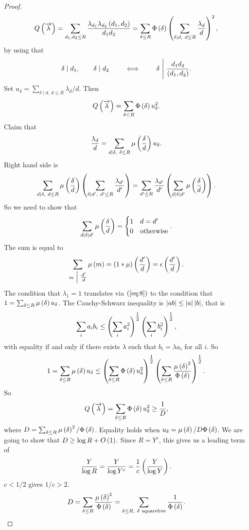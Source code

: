 \begin{proof}
$$ Q\left( \overrightarrow{\lambda} \right) = \sum_{d_1, d_2 \le R} \dfrac{\lambda_{d_1}\lambda_{d_2}\left( d_1, d_2 \right)}{d_1d_2} = \sum_{\delta \le R} \Phi\left( \delta \right)\left( \sum_{\delta \mid d, \ d \le R} \dfrac{\lambda_d}{d} \right)^2, $$
by using that
$$ \delta \mid d_1, \qquad \delta \mid d_2 \qquad \iff \qquad \delta \ \Bigg| \ \dfrac{d_1d_2}{\left( d_1, d_2 \right)}. $$
Set $ u_\delta = \sum_{\delta \mid d, \ d \le R} \lambda_d / d $.
Then
$$ Q\left( \overrightarrow{\lambda} \right) = \sum_{\delta \le R} \Phi\left( \delta \right)u_\delta^2. $$
Claim that
\begin{equation}
\label{eq:8}
\dfrac{\lambda_d}{d} = \sum_{d \mid \delta, \ \delta \le R} \mu\left( \dfrac{\delta}{d} \right)u_\delta.
\end{equation}
Right hand side is
$$ \sum_{d \mid \delta, \ d \le R} \mu\left( \dfrac{\delta}{d} \right)\left( \sum_{\delta \mid d', \ d' \le R} \dfrac{\lambda_{d'}}{d'} \right) = \sum_{d' \le R} \dfrac{\lambda_{d'}}{d'}\left( \sum_{d \mid \delta \mid d'} \mu\left( \dfrac{\delta}{d} \right) \right). $$
So we need to show that
$$ \sum_{d \mid \delta \mid d'} \mu\left( \dfrac{\delta}{d} \right) =
\begin{cases}
1 & d = d' \\
0 & \text{otherwise}
\end{cases}.
$$
The sum is equal to
$$ \sum_{m \ \Big| \  \tfrac{d'}{d}} \mu\left( m \right) = \left( 1 * \mu \right)\left( \dfrac{d'}{d} \right) = \epsilon\left( \dfrac{d'}{d} \right). $$
The condition that $ \lambda_1 = 1 $ translates via $ \left( \ref{eq:8} \right) $ to the condition that $ 1 = \sum_{\delta \le R} \mu\left( \delta \right)u_\delta $. The Cauchy-Schwarz inequality is $ \left\lvert ab \right\rvert \le \left\lvert a \right\rvert\left\lvert b \right\rvert $, that is
$$ \sum_i a_ib_i \le \left( \sum_i a_i^2 \right)^{\tfrac{1}{2}}\left( \sum_i b_i^2 \right)^{\tfrac{1}{2}}, $$
with equality if and only if there exists $ \lambda $ such that $ b_i = \lambda a_i $ for all $ i $. So
$$ 1 = \sum_{\delta \le R} \mu\left( \delta \right)u_\delta \le \left( \sum_{\delta \le R}\Phi\left( \delta \right)u_\delta^2 \right)^{\tfrac{1}{2}}\left( \sum_{\delta \le R}\dfrac{\mu\left( \delta \right)^2}{\Phi\left( \delta \right)} \right)^{\tfrac{1}{2}}. $$
So
$$ Q\left( \overrightarrow{\lambda} \right) = \sum_{\delta \le R} \Phi\left( \delta \right)u_\delta^2 \ge \dfrac{1}{D}, $$
where $ D = \sum_{\delta \le R} \mu\left( \delta \right)^2 / \Phi\left( \delta \right) $. Equality holds when $ u_\delta = \mu\left( \delta \right) / D\Phi\left( \delta \right) $. We are going to show that $ D \ge \log R + O\left( 1 \right) $. Since $ R = Y^c $, this gives us a leading term of
$$ \dfrac{Y}{\log R} = \dfrac{Y}{\log Y^c} = \dfrac{1}{c}\left( \dfrac{Y}{\log Y} \right). $$
$ c < 1 / 2 $ gives $ 1 / c > 2 $.
$$ D = \sum_{\delta \le R} \dfrac{\mu\left( \delta \right)^2}{\Phi\left( \delta \right)} = \sum_{\delta \le R, \ \delta \ \text{squarefree}} \dfrac{1}{\Phi\left( \delta \right)}. $$

\end{proof}
